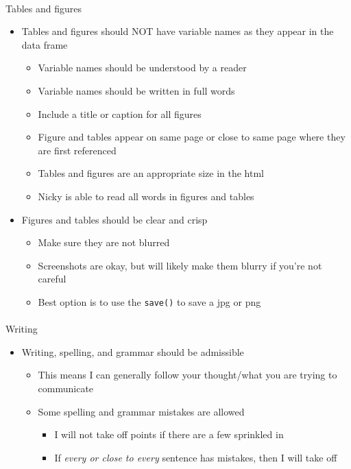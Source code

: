 \documentclass[
  letterpaper,
  DIV=11,
  numbers=noendperiod]{scrartcl}
\makeatletter
\let\oldparagraph\paragraph
\renewcommand{\paragraph}{
    \@ifstar
      \xxxParagraphStar
      \xxxParagraphNoStar
  }
\newcommand{\xxxParagraphStar}[1]{\oldparagraph*{#1}\mbox{}}
\newcommand{\xxxParagraphNoStar}[1]{\oldparagraph{#1}\mbox{}}
\providecommand{\tightlist}{%
  \setlength{\itemsep}{0pt}\setlength{\parskip}{0pt}}\usepackage{longtable,booktabs,array}
\makeatother
\begin{document}
\paragraph{Tables and figures}\label{tables-and-figures}

\begin{itemize}
\tightlist
\item
  Tables and figures should NOT have variable names as they appear in
  the data frame

  \begin{itemize}
  \tightlist
  \item
    Variable names should be understood by a reader
  \item
    Variable names should be written in full words
  \item
    Include a title or caption for all figures
  \item
    Figure and tables appear on same page or close to same page where
    they are first referenced
  \item
    Tables and figures are an appropriate size in the html
  \item
    Nicky is able to read all words in figures and tables
  \end{itemize}
\item
  Figures and tables should be clear and crisp

  \begin{itemize}
  \tightlist
  \item
    Make sure they are not blurred
  \item
    Screenshots are okay, but will likely make them blurry if you're not
    careful
  \item
    Best option is to use the \texttt{save()} to save a jpg or png
  \end{itemize}
\end{itemize}

\paragraph{Writing}\label{writing}

\begin{itemize}
\tightlist
\item
  Writing, spelling, and grammar should be admissible

  \begin{itemize}
  \tightlist
  \item
    This means I can generally follow your thought/what you are trying
    to communicate
  \item
    Some spelling and grammar mistakes are allowed

    \begin{itemize}
    \tightlist
    \item
      I will not take off points if there are a few sprinkled in
    \item
      If \emph{every or close to every} sentence has mistakes, then I
      will take off
    \end{itemize}
  \end{itemize}
\end{itemize}
\end{document}
